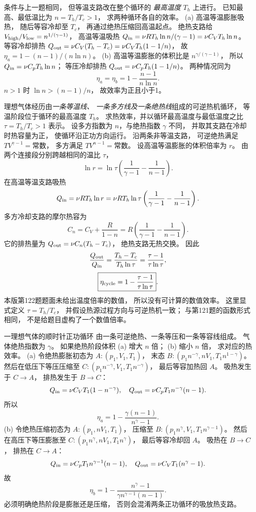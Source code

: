 条件与上一题相同，
但等温支路改在整个循环的
\emph{最高温度} $T_h$ 上进行。
已知最高、最低温比为
$n=T_h/T_c>1$，
求两种循环各自的效率。
\exsolution
(a) 高温等温膨胀吸热，
随后等容冷却至 $T_c$，
再通过绝热压缩回高温起点。
绝热支路给
$V_{\rm high}/V_{\rm low}
=n^{1/(\gamma-1)}$，
高温等温吸热
$Q_{\rm in}=\nu RT_h\ln n/(\gamma-1)
=\nu C_VT_h\ln n$。
等容冷却排热
$Q_{\rm out}=\nu C_V(T_h-T_c)
=\nu C_VT_h(1-1/n)$，
故
$\eta_a=1-(n-1)/(n\ln n)$。
(b) 高温等温膨胀的体积比是
$n^{\gamma/(\gamma-1)}$，
所以
$Q_{\rm in}=\nu C_pT_h\ln n$；
等压冷却排热
$Q_{\rm out}=\nu C_pT_h(1-1/n)$。
两种情况同为
\[
\boxed{\eta_a=\eta_b=1-\frac{n-1}{n\ln n}}.
\]
\excheck $n>1$ 时
$\ln n>(n-1)/n$，
故效率为正且小于1。

理想气体经历由\emph{一条等温线、
一条多方线及一条绝热线}组成的可逆热机循环，
等温阶段位于循环的最高温度 $T_h$。
求热效率，并以循环最高温度与最低温度之比
$\tau=T_h/T_c>1$ 表示。
\exsolution
设多方指数为 $n$，与绝热指数 $\gamma$ 不同，
并取其支路在冷却时热容量为正，
使循环沿正功方向运行。
沿两条非等温支路，
可逆绝热满足
$TV^{\gamma-1}=\text{常数}$，
多方满足
$TV^{n-1}=\text{常数}$。
设高温等温膨胀的体积倍率为 $r$。
由两个连接段分别跨越相同的温比 $\tau$，
\[
\ln r=
\ln\tau\left(\frac1{\gamma-1}-\frac1{n-1}\right).
\]
在高温等温支路吸热
\[
Q_{\rm in}=\nu RT_h\ln r
=\nu RT_h\ln\tau
\left(\frac1{\gamma-1}-\frac1{n-1}\right).
\]
多方冷却支路的摩尔热容为
\[
C_n=C_V+\frac R{1-n}
=R\left(\frac1{\gamma-1}-\frac1{n-1}\right).
\]
它的排热量为
$Q_{\rm out}=\nu C_n(T_h-T_c)$，
绝热支路无热交换。
因此
\[
\frac{Q_{\rm out}}{Q_{\rm in}}
=\frac{T_h-T_c}{T_h\ln\tau}
=\frac{\tau-1}{\tau\ln\tau},
\]
\[
\boxed{\eta_{\rm cycle}
=1-\frac{\tau-1}{\tau\ln\tau}}.
\]
\excheck 本版第122题题面未给出温度倍率的数值，
所以没有可计算的数值效率。
这里显式定义 $\tau=T_h/T_c$，
并假设热源过程方向与可逆热机一致；
与第121题的函数形式相同，
不是给题目虚构了一个数值倍率。

一理想气体的顺时针正功循环
由一条可逆绝热、一条等压和一条等容线组成。
气体绝热指数为 $\gamma$。
如果绝热阶段体积
(a) 增大 $n$ 倍；
(b) 缩小 $n$ 倍，
求对应的热效率。
\exsolution
(a) 令绝热膨胀初态为
$A:(p_1,V_1,T_1)$，
末态
$B:(p_1n^{-\gamma},nV_1,T_1n^{1-\gamma})$。
然后在低压下等压压缩至
$C:(p_1n^{-\gamma},V_1,T_1n^{-\gamma})$，
最后等容加热回 $A$。
吸热发生于 $C\to A$，
排热发生于 $B\to C$：
\[
Q_{\rm in}=\nu C_VT_1(1-n^{-\gamma}),
\quad
Q_{\rm out}=\nu C_pT_1n^{-\gamma}(n-1).
\]
所以
\[
\boxed{\eta_a=
1-\frac{\gamma(n-1)}{n^\gamma-1}}.
\]
(b) 令绝热压缩初态为
$A:(p_1,nV_1,T_1)$，
压缩至
$B:(p_1n^\gamma,V_1,T_1n^{\gamma-1})$。
然后在高压下等压膨胀至
$C:(p_1n^\gamma,nV_1,T_1n^\gamma)$，
最后等容冷却回 $A$。
吸热在 $B\to C$，
排热在 $C\to A$：
\[
Q_{\rm in}=\nu C_pT_1n^{\gamma-1}(n-1),
\quad Q_{\rm out}=\nu C_VT_1(n^\gamma-1).
\]
故
\[
\boxed{\eta_b=
1-\frac{n^\gamma-1}
{\gamma n^{\gamma-1}(n-1)}}.
\]
\excheck 必须明确绝热阶段是膨胀还是压缩，
否则会混淆两条正功循环的吸放热支路。

